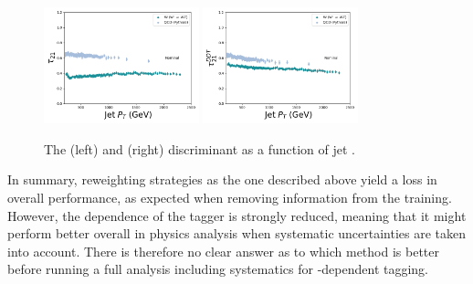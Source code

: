 \begin{figure}[h!]
\centering
\includegraphics[width=0.4\textwidth]{figures/vtagging/lola/tau21_-profile-jpt.png}
\includegraphics[width=0.4\textwidth]{figures/vtagging/lola/ddt_-profile-jpt.png}
\caption{The \nsubj (left) and \ddt (right) discriminant as a function of jet \PT.}
\label{fig:lola:nsubjcorr}
\end{figure}
In summary, reweighting strategies as the one described above yield a loss in overall performance, as expected when removing information from the training. However, the \PT dependence of the tagger is strongly reduced, meaning that it might perform better overall in physics analysis when systematic uncertainties are taken into account. There is therefore no clear answer as to which method is better before running a full analysis including systematics for \PT-dependent tagging.
 
